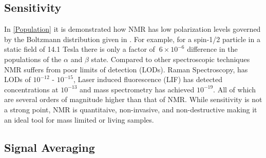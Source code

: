  \subsection{Sensitivity}\label{Sensitivity}

In \ref{Population} it is demonstrated how NMR has low polarization levels governed by the Boltzmann
distribution given in . For example, for a spin-1/2 particle in a static field of 14.1 Tesla
there is only a factor of $~6\times10^{-6}$ difference in the populations of the $\alpha$ and $\beta$ state.
Compared to other spectroscopic techniques NMR suffers from poor limits of detection (LODs). Raman Spectroscopy, has
LODs of $10^{-12}$ - $10^{-15}$, Laser induced fluorescence (LIF) has detected concentrations at $10^{-13}$ and
mass spectrometry has achieved $10^{-19}$. All of which are several orders of magnitude higher than that of NMR.
While sensitivity is not a strong point, NMR is quantitaive, non-invasive, and non-destructive making it an ideal
tool for mass limited or living samples.

 \subsection{Signal Averaging}\label{Signal Averaging}

